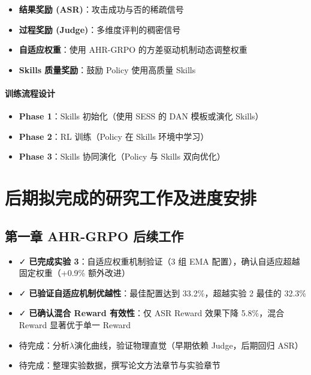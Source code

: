 \documentclass[12pt,a4paper]{article}
\newcommand{\highlight}[1]{\textcolor{primaryblue}{\textbf{#1}}}
\newcommand{\success}[1]{\textcolor{successgreen}{#1}}
\begin{document}
\begin{itemize}
    \item \highlight{结果奖励 (ASR)}：攻击成功与否的稀疏信号
    \item \highlight{过程奖励 (Judge)}：多维度评判的稠密信号
    \item \highlight{自适应权重}：使用 AHR-GRPO 的方差驱动机制动态调整权重
    \item \highlight{Skills 质量奖励}：鼓励 Policy 使用高质量 Skills
\end{itemize}

\paragraph{训练流程设计}

\begin{itemize}
    \item \highlight{Phase 1}：Skills 初始化（使用 SESS 的 DAN 模板或演化 Skills）
    \item \highlight{Phase 2}：RL 训练（Policy 在 Skills 环境中学习）
    \item \highlight{Phase 3}：Skills 协同演化（Policy 与 Skills 双向优化）
\end{itemize}

\section{后期拟完成的研究工作及进度安排}

\subsection{第一章 AHR-GRPO 后续工作}

\begin{itemize}
    \item \success{✓} \highlight{已完成实验 3}：自适应权重机制验证（3 组 EMA 配置），确认自适应超越固定权重（+0.9\% 额外改进）
    \item \success{✓} \highlight{已验证自适应机制优越性}：最佳配置达到 33.2\%，超越实验 2 最佳的 32.3\%
    \item \success{✓} \highlight{已确认混合 Reward 有效性}：仅 ASR Reward 效果下降 5.8\%，混合 Reward 显著优于单一 Reward
    \item 待完成：分析$\lambda$演化曲线，验证物理直觉（早期依赖 Judge，后期回归 ASR）
    \item 待完成：整理实验数据，撰写论文方法章节与实验章节
\end{itemize}
\end{document}
